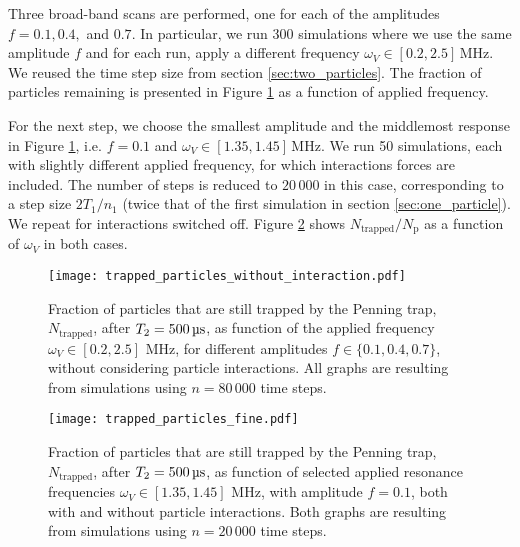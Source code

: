 Three broad-band scans are performed, one for each of the amplitudes $f=0.1, 0.4,$ and $0.7$. In particular, we run 300 simulations where we use the same amplitude $f$ and for each run, apply a different frequency $\omega_V \in[0.2,2.5] \,\mathrm{MHz}$. We reused the time step size from section \ref{sec:two_particles}. The fraction of particles remaining is presented in Figure \ref{fig:trapped_without} as a function of applied frequency. 

For the next step, we choose the smallest amplitude and the middlemost response in Figure \ref{fig:trapped_without}, i.e. $f=0.1$ and $\omega_V \in[1.35,1.45] \,\mathrm{MHz}$. We run 50 simulations, each with slightly different applied frequency, for which interactions forces are included. The number of steps is reduced to $20\,000$ in this case, corresponding to a step size $2 T_1/n_1$ (twice that of the first simulation in section \ref{sec:one_particle}). We repeat for interactions switched off. Figure \ref{fig:trapped_with} shows $N_\mathrm{trapped}/N_\mathrm{p}$ as a function of $\omega_V$ in both cases. 


\begin{figure}
    \texttt{[image: trapped\_particles\_without\_interaction.pdf]}
    \caption{Fraction of particles that are still trapped by the Penning trap, $N_\mathrm{trapped}$, after $T_2=500\,\mus$, as function of the applied frequency $\omega_V\in[0.2,2.5]$ MHz, for different amplitudes $f\in\{0.1, 0.4, 0.7\}$, without considering particle interactions. All graphs are resulting from simulations using $n=80\,000$ time steps.}
    \label{fig:trapped_without}
\end{figure}

\begin{figure}
    \texttt{[image: trapped\_particles\_fine.pdf]}
    \caption{Fraction of particles that are still trapped by the Penning trap, $N_\mathrm{trapped}$, after $T_2=500\,\mus$, as function of selected applied resonance frequencies $\omega_V\in[1.35,1.45]$ MHz, with amplitude $f=0.1$, both with and without particle interactions. Both graphs are resulting from simulations using $n=20\,000$ time steps.}
    \label{fig:trapped_with}
\end{figure}



